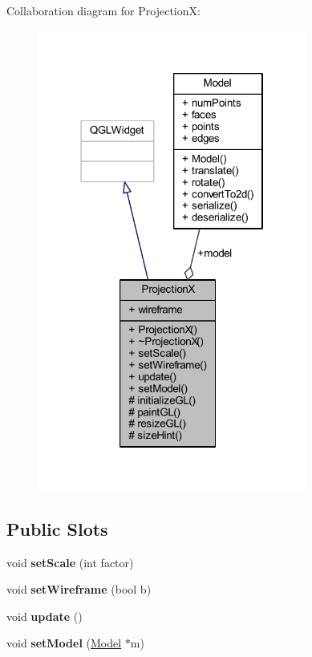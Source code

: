 Collaboration diagram for ProjectionX\+:
\nopagebreak
\begin{figure}[H]
\begin{center}
\leavevmode
\includegraphics[width=250pt]{class_projection_x__coll__graph}
\end{center}
\end{figure}
\subsection*{Public Slots}
\begin{DoxyCompactItemize}
\item 
\mbox{\label{class_projection_x_a863c01fcbb77cb13856feb3605fc6390}} 
void {\bfseries set\+Scale} (int factor)
\item 
\mbox{\label{class_projection_x_a16849f2ef9fe0332c0ad9f833dc85651}} 
void {\bfseries set\+Wireframe} (bool b)
\item 
\mbox{\label{class_projection_x_a7efa3839fdf999686464fe60ea59a349}} 
void {\bfseries update} ()
\item 
\mbox{\label{class_projection_x_aab00d67a74912bdff9f963664b708c14}} 
void {\bfseries set\+Model} (\mbox{\hyperlink{class_model}{Model}} $\ast$m)
\end{DoxyCompactItemize}
